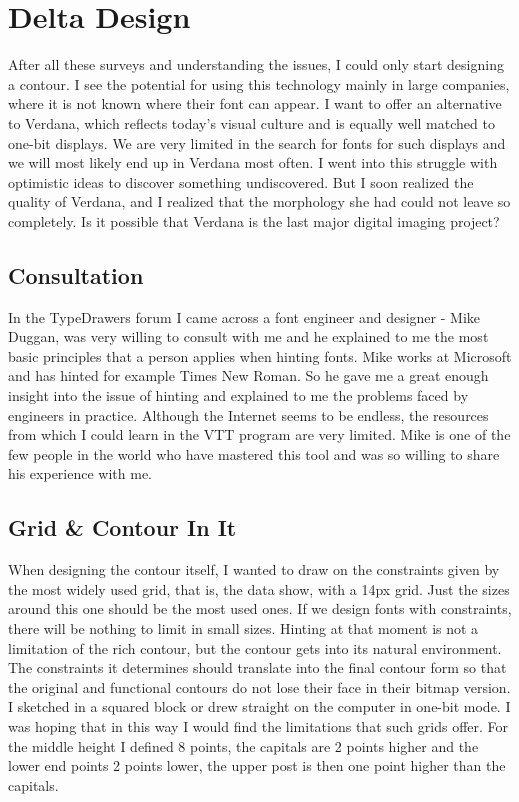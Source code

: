 \documentclass[a4paper]{article}
\begin{document}
\section{Delta Design}
After all these surveys and understanding the issues, I could only start designing a contour. I see the potential for using this technology mainly in large companies, where it is not known where their font can appear. I want to offer an alternative to Verdana, which reflects today's visual culture and is equally well matched to one-bit displays. We are very limited in the search for fonts for such displays and we will most likely end up in Verdana most often. I went into this struggle with optimistic ideas to discover something undiscovered. But I soon realized the quality of Verdana, and I realized that the morphology she had could not leave so completely. Is it possible that Verdana is the last major digital imaging project?

\subsection{Consultation}
In the TypeDrawers forum  I came across a font engineer and designer - Mike Duggan, was very willing to consult with me and he explained to me the most basic principles that a person applies when hinting fonts. Mike works at Microsoft and has hinted for example Times New Roman. So he gave me a great enough insight into the issue of hinting and explained to me the problems faced by engineers in practice. Although the Internet seems to be endless, the resources from which I could learn in the VTT program are very limited. Mike is one of the few people in the world who have mastered this tool and was so willing to share his experience with me.

\subsection{Grid \& Contour In It}
When designing the contour itself, I wanted to draw on the constraints given by the most widely used grid, that is, the data show, with a 14px grid. Just the sizes around this one should be the most used ones. If we design fonts with constraints, there will be nothing to limit in small sizes. Hinting at that moment is not a limitation of the rich contour, but the contour gets into its natural environment. The constraints it determines should translate into the final contour form so that the original and functional contours do not lose their face in their bitmap version. I sketched in a squared block or drew straight on the computer in one-bit mode. I was hoping that in this way I would find the limitations that such grids offer. For the middle height I defined 8 points, the capitals are 2 points higher and the lower end points 2 points lower, the upper post is then one point higher than the capitals. 
\end{document}
